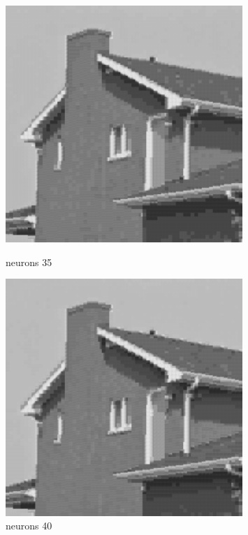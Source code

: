 \documentclass[../IDP_Task5_Karwowski_Kowalewski.tex]{subfiles}
\begin{document}
{{        \begin{figure}[!htbp]
            \begin{minipage}[c]{0.45\linewidth}
                \centering
                \includegraphics[width=0.8\textwidth]{img/kowalewski/crop_size_4_neurons_35.png}
                \caption{neurons 35}
            \end{minipage}\hfill
            \begin{minipage}[c]{0.45\linewidth}
                \centering
                \includegraphics[width=0.8\textwidth]{img/kowalewski/crop_size_4_neurons_40.png}
                \caption{neurons 40}
            \end{minipage}
        \end{figure}

}}
\end{document}
